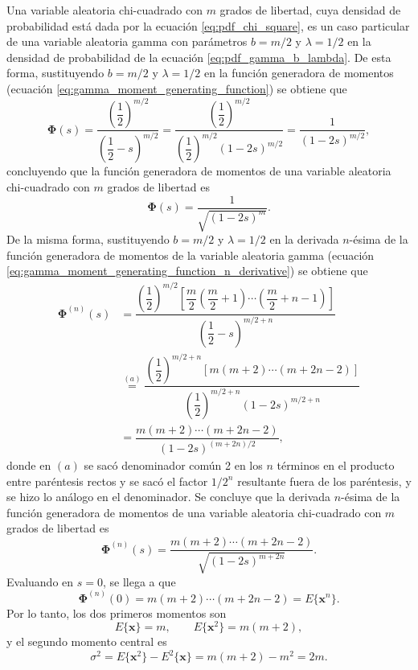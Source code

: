 \documentclass[a4paper]{report}
\newcommand{\x}{\mathbf{x}}
\newcommand{\Phibf}{\mathbf{\Phi}}
\begin{document}
Una variable aleatoria chi-cuadrado con \(m\) grados de libertad, cuya densidad de probabilidad está dada por la ecuación \ref{eq:pdf_chi_square}, es un caso particular de una variable aleatoria gamma con parámetros \(b=m/2\) y \(\lambda=1/2\) en la densidad de probabilidad de la ecuación \ref{eq:pdf_gamma_b_lambda}. De esta forma, sustituyendo \(b=m/2\) y \(\lambda=1/2\) en la función generadora de momentos (ecuación \ref{eq:gamma_moment_generating_function}) se obtiene que
\[
 \Phibf(s)=\dfrac{\left(\dfrac{1}{2}\right)^{m/2}}{\left(\dfrac{1}{2}-s\right)^{m/2}}
 =\dfrac{\left(\dfrac{1}{2}\right)^{m/2}}{\left(\dfrac{1}{2}\right)^{m/2}\left(1-2s\right)^{m/2}}
 =\frac{1}{(1-2s)^{m/2}},
\]
concluyendo que la función generadora de momentos de una variable aleatoria chi-cuadrado con \(m\) grados de libertad es
\begin{equation}\label{eq:chi_square_moment_generating_function}
 \Phibf(s)=\frac{1}{\sqrt{(1-2s)^m}}.
\end{equation}
De la misma forma, sustituyendo \(b=m/2\) y \(\lambda=1/2\) en la derivada \(n\)-ésima de la función generadora de momentos de la variable aleatoria gamma (ecuación \ref{eq:gamma_moment_generating_function_n_derivative}) se obtiene que
\begin{align*}
 \Phibf^{(n)}(s)&=\dfrac{\left(\dfrac{1}{2}\right)^{m/2}\left[\dfrac{m}{2}\left(\dfrac{m}{2}+1\right)\cdots\left(\dfrac{m}{2}+n-1\right)\right]}{\left(\dfrac{1}{2}-s\right)^{m/2+n}}\\
   &\overset{(a)}{=}\dfrac{\left(\dfrac{1}{2}\right)^{m/2+n}\left[m\left(m+2\right)\cdots\left(m+2n-2\right)\right]}{\left(\dfrac{1}{2}\right)^{m/2+n}\left(1-2s\right)^{m/2+n}}\\
   &=\dfrac{m\left(m+2\right)\cdots\left(m+2n-2\right)}{\left(1-2s\right)^{(m+2n)/2}},
\end{align*}
donde en \((a)\) se sacó denominador común 2 en los \(n\) términos en el producto entre paréntesis rectos y se sacó el factor \(1/2^n\) resultante fuera de los paréntesis, y se hizo lo análogo en el denominador.
Se concluye que la derivada \(n\)-ésima de la función generadora de momentos de una variable aleatoria chi-cuadrado con \(m\) grados de libertad es
\[
 \Phibf^{(n)}(s)=\dfrac{m\left(m+2\right)\cdots\left(m+2n-2\right)}{\sqrt{\left(1-2s\right)^{m+2n}}}.
\]
Evaluando en \(s=0\), se llega a que
\[
 \Phibf^{(n)}(0)=m\left(m+2\right)\cdots\left(m+2n-2\right)=E\{\x^n\}.
\]
Por lo tanto, los dos primeros momentos son
\[
 E\{\x\}=m,\qquad E\{\x^2\}=m(m+2),
\]
y el segundo momento central es
\[
 \sigma^2=E\{\x^2\}-E^2\{\x\}=m(m+2)-m^2=2m.
\]
\end{document}
